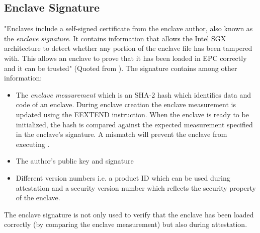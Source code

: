 \subsection{Enclave Signature}
\label{sec:EnclaveSignature}
"Enclaves include a self-signed certificate from the enclave author, also known as the \textit{enclave signature}. It contains information that allows the Intel SGX architecture 
to detect whether any portion of the enclave file has been tampered with. This allows an enclave to prove that it has been loaded in EPC correctly and it can be trusted" (Quoted
from \cite{IntelEnclaveSignature}). The signature contains among other information:
\begin{itemize}
    \item The \textit{enclave measurement} which is an SHA-2 hash \cite{Costan2016IntelSE} which identifies data and code of an enclave. During enclave creation the enclave
          measurement is updated using the EEXTEND instruction. When the enclave is ready to be initialized, the hash is compared against the expected measurement specified
          in the enclave's signature. A mismatch will prevent the enclave from executing \cite{IntelEnclaveSignature}.
    \item The author's public key and signature
    \item Different version numbers i.e. a product ID which can be used during attestation and a security version number which reflects the security property of the enclave.
\end{itemize}
The enclave signature is not only used to verify that the enclave has been loaded correctly (by comparing the enclave measurement) but also during attestation.
